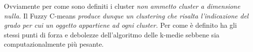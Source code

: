 Ovviamente per come sono definiti i cluster \textit{non ammetto cluster a dimensione nulla.} Il Fuzzy C-means \textit{produce dunque un clustering che risalta l'indicazione del grado per cui un oggetto appartiene ad ogni cluster.} Per come è definito ha gli stessi punti di forza e debolezze dell'algoritmo delle k-medie sebbene sia computazionalmente più pesante.


